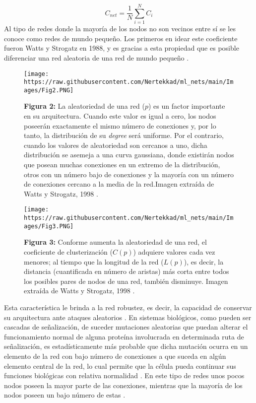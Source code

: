 \documentclass[
]{book}
\begin{document}
\[C_{net}=\frac{1}{N}\sum_{i=1}^{N} C_{i}\]
Al tipo de redes donde la mayoría de los nodos no son vecinos entre sí se les conoce como redes de mundo pequeño. Los primeros en idear este coeficiente fueron Watts y Strogatz en 1988, y es gracias a esta propiedad que es posible diferenciar una red aleatoria de una red de mundo pequeño \citep{watts1998collective}.

\begin{figure}
\centering
\texttt{[image: https://raw.githubusercontent.com/Nertekkad/ml\_nets/main/Images/Fig2.PNG]}
\caption{\textbf{Figura 2:} La aleatoriedad de una red (\(p\)) es un factor importante en su arquitectura. Cuando este valor es igual a cero, los nodos poseerán exactamente el mismo número de conexiones y, por lo tanto, la distribución de su \emph{degree} será uniforme. Por el contrario, cuando los valores de aleatoriedad son cercanos a uno, dicha distribución se asemeja a una curva gaussiana, donde existirán nodos que posean muchas conexiones en un extremo de la distribución, otros con un número bajo de conexiones y la mayoría con un número de conexiones cercano a la media de la red.Imagen extraída de Watts y Strogatz, 1998 \citep{watts1998collective}.}
\end{figure}

\begin{figure}
\centering
\texttt{[image: https://raw.githubusercontent.com/Nertekkad/ml\_nets/main/Images/Fig3.PNG]}
\caption{\textbf{Figura 3:} Conforme aumenta la aleatoriedad de una red, el coeficiente de clusterización (\(C(p)\)) adquiere valores cada vez menores; al tiempo que la longitud de la red (\(L(p)\)), es decir, la distancia (cuantificada en número de aristas) más corta entre todos los posibles pares de nodos de una red, también disminuye. Imagen extraída de Watts y Strogatz, 1998 \citep{watts1998collective}.}
\end{figure}

Esta característica le brinda a la red robustez, es decir, la capacidad de conservar su arquitectura ante ataques aleatorios \citep{newmanoxford}. En sistemas biológicos, como pueden ser cascadas de señalización, de suceder mutaciones aleatorias que puedan alterar el funcionamiento normal de alguna proteína involucrada en determinada ruta de señalización, es estadísticamente más probable que dicha mutación ocurra en un elemento de la red con bajo número de conexiones a que suceda en algún elemento central de la red, lo cual permite que la célula pueda continuar sus funciones biológicas con relativa normalidad \citep{das2020small}. En este tipo de redes unos pocos nodos poseen la mayor parte de las conexiones, mientras que la mayoría de los nodos poseen un bajo número de estas \citep{newmanoxford}.
\end{document}
